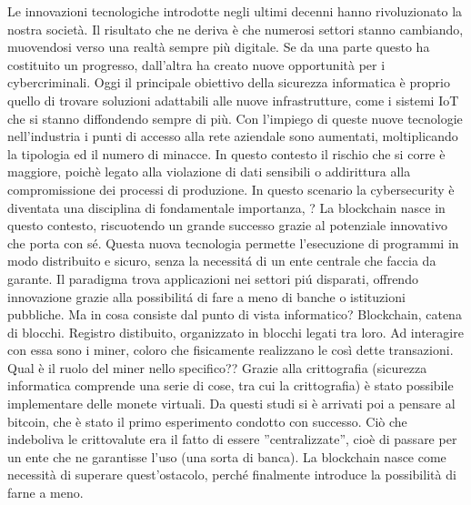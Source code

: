 
Le innovazioni tecnologiche introdotte negli ultimi decenni hanno rivoluzionato la nostra società. Il risultato che ne deriva è che numerosi settori stanno cambiando, muovendosi verso una realtà sempre più digitale. Se da una parte questo ha costituito un progresso, dall'altra ha creato nuove opportunità per i cybercriminali.\newline
Oggi il principale obiettivo della sicurezza informatica è proprio quello di trovare soluzioni adattabili alle nuove infrastrutture, come i sistemi IoT che si stanno diffondendo sempre di più. Con l'impiego di queste nuove tecnologie nell'industria i punti di accesso alla rete aziendale sono aumentati, moltiplicando la tipologia ed il numero di minacce. In questo contesto il rischio che si corre è maggiore, poichè legato alla violazione di dati sensibili o addirittura alla compromissione dei processi di produzione.\newline
\newline
In questo scenario la cybersecurity è diventata una disciplina di fondamentale importanza, ?\newline
La blockchain nasce in questo contesto, riscuotendo un grande successo grazie al potenziale innovativo che porta con sé. Questa nuova tecnologia permette l'esecuzione di programmi in modo distribuito e sicuro, senza la necessitá di un ente centrale che faccia da garante. Il paradigma
trova applicazioni nei settori piú disparati, offrendo innovazione grazie alla
possibilitá di fare a meno di banche o istituzioni pubbliche.\newline
Ma in cosa consiste dal punto di vista informatico?
Blockchain, catena di blocchi.
Registro distibuito, organizzato in blocchi legati tra loro. Ad interagire con essa sono i miner, coloro che fisicamente realizzano le così dette transazioni. 
Qual è il ruolo del miner nello specifico??\newline
\newline
Grazie alla crittografia (sicurezza informatica comprende una serie di cose, tra cui la crittografia) è stato possibile implementare delle monete virtuali. Da questi studi si è arrivati poi a pensare al bitcoin, che è stato il primo esperimento condotto con successo.\newline
Ciò che indeboliva le crittovalute era il fatto di essere ''centralizzate'', cioè di passare per un ente che ne garantisse l'uso (una sorta di banca).\newline
La blockchain nasce come necessità di superare quest'ostacolo, perché finalmente introduce la possibilità di farne a meno.
